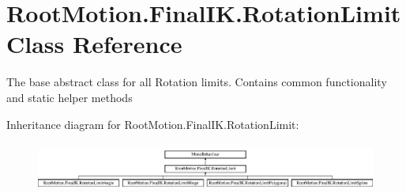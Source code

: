 \hypertarget{class_root_motion_1_1_final_i_k_1_1_rotation_limit}{}\section{Root\+Motion.\+Final\+I\+K.\+Rotation\+Limit Class Reference}
\label{class_root_motion_1_1_final_i_k_1_1_rotation_limit}


The base abstract class for all Rotation limits. Contains common functionality and static helper methods  


Inheritance diagram for Root\+Motion.\+Final\+I\+K.\+Rotation\+Limit\+:\begin{figure}[H]
\begin{center}
\leavevmode
\includegraphics[height=1.640625cm]{class_root_motion_1_1_final_i_k_1_1_rotation_limit}
\end{center}
\end{figure}
